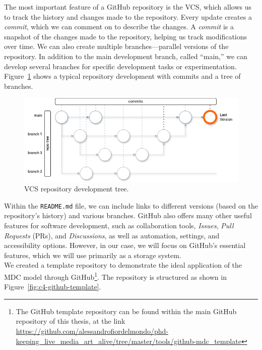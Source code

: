 The most important feature of a GitHub repository is the VCS, which allows us to track the history and changes made to the repository. Every update creates a \textit{commit}, which we can comment on to describe the changes. A \textit{commit} is a snapshot of the changes made to the repository, helping us track modifications over time. We can also create multiple branches—parallel versions of the repository. In addition to the main development branch, called ``main,'' we can develop several branches for specific development tasks or experimentation. Figure~\ref{fig:c4-github-tree} shows a typical repository development with commits and a tree of branches.

\begin{figure}[!h]
    \centering
    \includegraphics[width=1\linewidth]{chapters/4-MDC_model_application/image/graph04-githubtree.png}
    \caption{VCS repository development tree.}
    \label{fig:c4-github-tree}
\end{figure}

Within the \texttt{README.md} file, we can include links to different versions (based on the repository’s history) and various branches. GitHub also offers many other useful features for software development, such as collaboration tools, \textit{Issues}, \textit{Pull Requests} (PRs), and \textit{Discussions}, as well as automation, settings, and accessibility options. However, in our case, we will focus on GitHub’s essential features, which we will use primarily as a storage system.\\
We created a template repository to demonstrate the ideal application of the MDC model through GitHub\footnote{The GitHub template repository can be found within the main GitHub repository of this thesis, at the link \url{https://github.com/alessandrofiordelmondo/phd-keeping_live_media_art_alive/tree/master/tools/github-mdc_template}}. The repository is structured as shown in Figure~\ref{fig:c4-github-template}.

